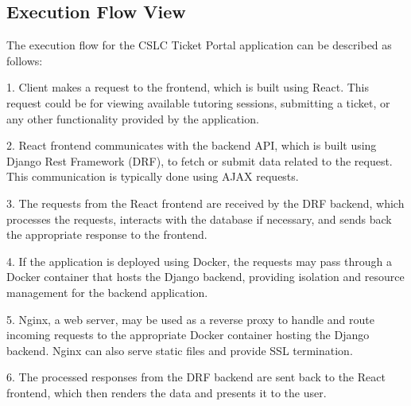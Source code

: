 \documentclass[oneside,openany,obeyspaces]{book}
\begin{document}
\begin{flushleft}
    \section{Execution Flow View}

    The execution flow for the CSLC Ticket Portal application can be described as follows:

    1. Client makes a request to the frontend, which is built using React. This request could be for viewing available tutoring sessions, submitting a ticket, or any other functionality provided by the application.

    2. React frontend communicates with the backend API, which is built using Django Rest Framework (DRF), to fetch or submit data related to the request. This communication is typically done using AJAX requests.

    3. The requests from the React frontend are received by the DRF backend, which processes the requests, interacts with the database if necessary, and sends back the appropriate response to the frontend.

    4. If the application is deployed using Docker, the requests may pass through a Docker container that hosts the Django backend, providing isolation and resource management for the backend application.

    5. Nginx, a web server, may be used as a reverse proxy to handle and route incoming requests to the appropriate Docker container hosting the Django backend. Nginx can also serve static files and provide SSL termination.

    6. The processed responses from the DRF backend are sent back to the React frontend, which then renders the data and presents it to the user.


\end{flushleft}
\end{document}
